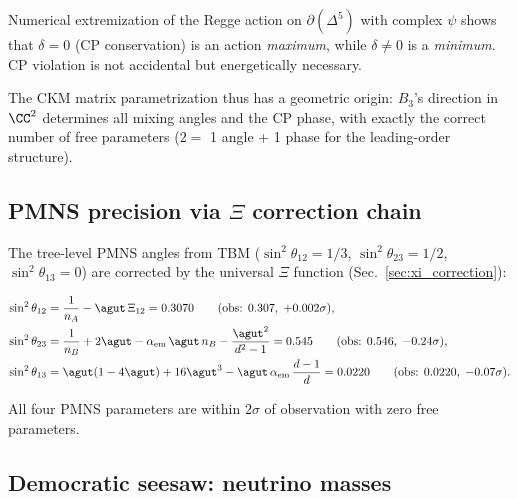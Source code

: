 \begin{proposition}
\label{prop:cp}
Numerical extremization of the Regge action on $\partial(\Delta^5)$ with complex $\psi$ shows that $\delta = 0$ (CP conservation) is an action \emph{maximum}, while $\delta \neq 0$ is a \emph{minimum}.  CP violation is not accidental but energetically necessary.
\end{proposition}

The CKM matrix parametrization thus has a geometric origin: $B_3$'s direction in $\CC^2$ determines all mixing angles and the CP phase, with exactly the correct number of free parameters ($2 = $ 1 angle + 1 phase for the leading-order structure).

\subsection{PMNS precision via $\Xi$ correction chain}
\label{sec:pmns_xi}

The tree-level PMNS angles from TBM ($\sin^2\theta_{12} = 1/3$, $\sin^2\theta_{23} = 1/2$, $\sin^2\theta_{13} = 0$) are corrected by the universal $\Xi$ function (Sec.~\ref{sec:xi_correction}):

\begin{align}
\sin^2\theta_{12} &= \frac{1}{n_A} - \agut\,\Xi_{12} = 0.3070 \qquad(\text{obs: } 0.307,\; +0.002\sigma), \\
\sin^2\theta_{23} &= \frac{1}{n_B} + 2\agut - \alpha_\mathrm{em}\,\agut\,n_B - \frac{\agut^2}{d^2-1} = 0.545 \qquad(\text{obs: } 0.546,\; -0.24\sigma), \\
\sin^2\theta_{13} &= \agut(1 - 4\agut) + 16\agut^3 - \agut\,\alpha_\mathrm{em}\,\frac{d-1}{d} = 0.0220 \qquad(\text{obs: } 0.0220,\; -0.07\sigma).
\end{align}

All four PMNS parameters are within $2\sigma$ of observation with zero free parameters.

\subsection{Democratic seesaw: neutrino masses}
\label{sec:democratic_seesaw}

